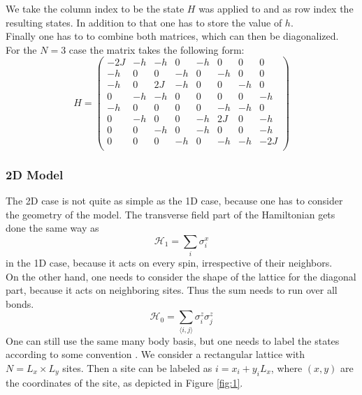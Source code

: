 \documentclass[a4paper,12pt]{article}
\begin{document}
We take the column index to be the state $H$ was applied to and as row
index the resulting states. In addition to that one has to store the value of $h$.\\
Finally one has to to combine both matrices, which can then be
diagonalized.\\
For the $N = 3$ case the matrix takes the following form:
\begin{equation*}
\label{eq:23}
H = 
\begin{pmatrix}
-2J & -h & -h &  0& -h & 0 &0 &0 \\
-h &0 &0 & -h &  0& -h & 0& 0\\
-h & 0& 2J & -h & 0& 0& -h &0 \\
 0& -h & -h&0 & 0& 0& 0& -h\\
-h &0 &0 &0 &0 & -h & -h &0 \\
 0& -h &0 &0 & -h & 2J &0 & -h\\
 0& 0& -h & 0& -h &0 &0 & -h\\
 0& 0& 0& -h & 0& -h & -h & -2J\\
\end{pmatrix}
\end{equation*}

\subsubsection{2D Model}

The 2D case is not quite as simple as the 1D case, because one has to
consider the geometry of the model. The transverse field part of the Hamiltonian gets done the same way as
\begin{equation}
\label{eq:25}
\mathcal{H}_1 = \sum\limits_i \sigma_i^x
\end{equation}
in the 1D case, because it acts on every spin, irrespective of
their neighbors.\\
On the other hand, one needs to consider the shape of the lattice for
the diagonal part, because it acts on neighboring sites. Thus the sum
needs to run over all bonds.
\begin{equation}
\label{eq:26}
\mathcal{H}_0 = \sum\limits_{\langle i,j \rangle} \sigma_i^z \sigma_j^z
\end{equation}
One can still use the same many body basis, but one needs to label the
states according to some convention \cite{Sandvik}. We consider a rectangular lattice
with $N = L_x \times L_y$ sites. Then a site can be labeled as $i =
x_i + y_iL_x$, where $(x,y)$ are the coordinates of the site, as
depicted in Figure \eqref{fig:1}.
\end{document}

